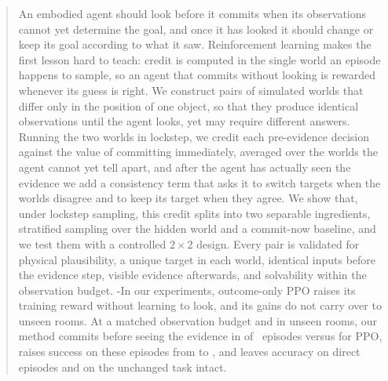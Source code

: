 \begin{abstract}
An embodied agent should look before it commits when its observations cannot yet determine the goal, and once it has looked it should change or keep its goal according to what it saw.
Reinforcement learning makes the first lesson hard to teach: credit is computed in the single world an episode happens to sample, so an agent that commits without looking is rewarded whenever its guess is right.
We construct pairs of simulated worlds that differ only in the position of one object, so that they produce identical observations until the agent looks, yet may require different answers.
Running the two worlds in lockstep, we credit each pre-evidence decision against the value of committing immediately, averaged over the worlds the agent cannot yet tell apart, and after the agent has actually seen the evidence we add a consistency term that asks it to switch targets when the worlds disagree and to keep its target when they agree.
We show that, under lockstep sampling, this credit splits into two separable ingredients, stratified sampling over the hidden world and a commit-now baseline, and we test them with a controlled $2{\times}2$ design.
Every pair is validated for physical plausibility, a unique target in each world, identical inputs before the evidence step, visible evidence afterwards, and solvability within the observation budget.
\hyp{In our experiments, outcome-only PPO raises its training reward without learning to look, and its gains do not carry over to unseen rooms.
At a matched observation budget and in unseen rooms, our method commits before seeing the evidence in \tbd{} of \Look\ episodes versus \tbd{} for PPO, raises success on these episodes from \tbd{} to \tbd{}, and leaves accuracy on direct episodes and on the unchanged task intact.}
\end{abstract}
